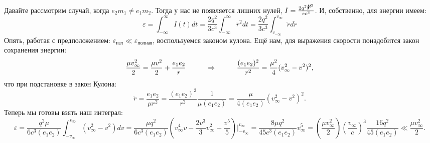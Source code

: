 Давайте рассмотрим случай, когда $e_2 m_1 \neq e_1 m_2$. Тогда у нас не появляется лишних нулей, $I = \frac{ 2 q^2 \mbox{\boldmath $\ddot{r}$}^2}{e c^3}$. И, собственно, для энергии имеем:
\begin{equation*}
	\varepsilon = \int_{-\infty}^{\infty} I(t) dt = \frac{2 q^2}{3 c^3} \int_{-\infty}^{\infty} \ddot{r}^2 d t
	=
	\frac{2 q^2}{3 c^3} \int_{v_{-\infty}}^{v_{\infty}} \ddot{r} d \dot{r}
\end{equation*}
Опять, работая с предположением: $\varepsilon_{\text{изл}}\ll \varepsilon_{\text{полная}}$, воспользуемся законом кулона. Ещё нам, для выражения скорости понадобится закон сохранения энергии:
\begin{equation*}
	\frac{\mu v^2_\infty}{2} = \frac{\mu v^2}{2} + \frac{e_1 e_2}{r}
	\hspace{1 cm}
	\Rightarrow
	\hspace{1 cm}
	\frac{(e_1 e_2)^2}{r^2} = \frac{\mu^2}{4} (v_\infty^2 - v^2)^2,
\end{equation*}
что при подстановке в закон Кулона:
\begin{equation*}
	\ddot{r} = \frac{e_1 e_2}{\mu r^2} = \frac{(e_1 e_2)^2}{r^2} \frac{1}{\mu (e_1 e_2)}
	=
	\frac{\mu}{4 (e_1 e_2)} (v_\infty^2 - v^2)^2.
\end{equation*}
Теперь мы готовы взять наш интеграл:
\begin{equation*}
	\varepsilon = \frac{q^2 \mu}{6 c^3 (e_1 e_2)} \int_{- v_\infty}^{v_\infty} (v_\infty^2 - v^2) d v
	=
	\frac{\mu q^2}{6 c^3 (e_1 e_2)} \left(v_\infty^4 v - \frac{2 v^{3}}{3} v_\infty^2 + \frac{v^5}{5}\right) \bigg|_{-v_\infty}^{v_\infty}
	=
	\frac{8 \mu q^2}{45 c^3 (e_1 e_2)} v_\infty^5
	=
	\left(\frac{\mu v_\infty^2}{2}\right) \left(\frac{v_\infty}{c}\right)^3 \frac{16 q^2}{45 (e_1 e_2)}
	\ll \frac{\mu v_\infty^2}{2}.
\end{equation*}